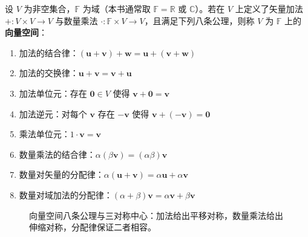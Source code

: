 \begin{definition}[向量空间]\label{def:vector_space}
设 $V$ 为非空集合，$\mathbb{F}$ 为域（本书通常取 $\mathbb{F} = \mathbb{R}$ 或 $\mathbb{C}$）。若在 $V$ 上定义了矢量加法 $+: V \times V \to V$ 与数量乘法 $\cdot: \mathbb{F} \times V \to V$，且满足下列八条公理，则称 $V$ 为 $\mathbb{F}$ 上的\textbf{向量空间}：
\begin{enumerate}[label=(\roman*)]
    \item 加法的结合律：$(\mathbf{u} + \mathbf{v}) + \mathbf{w} = \mathbf{u} + (\mathbf{v} + \mathbf{w})$
    \item 加法的交换律：$\mathbf{u} + \mathbf{v} = \mathbf{v} + \mathbf{u}$
    \item 加法单位元：存在 $\mathbf{0} \in V$ 使得 $\mathbf{v} + \mathbf{0} = \mathbf{v}$
    \item 加法逆元：对每个 $\mathbf{v}$ 存在 $-\mathbf{v}$ 使得 $\mathbf{v} + (-\mathbf{v}) = \mathbf{0}$
    \item 乘法单位元：$1 \cdot \mathbf{v} = \mathbf{v}$
    \item 数量乘法的结合律：$\alpha(\beta\mathbf{v}) = (\alpha\beta)\mathbf{v}$
    \item 数量对矢量的分配律：$\alpha(\mathbf{u} + \mathbf{v}) = \alpha\mathbf{u} + \alpha\mathbf{v}$
    \item 数量对域加法的分配律：$(\alpha + \beta)\mathbf{v} = \alpha\mathbf{v} + \beta\mathbf{v}$
\end{enumerate}
\end{definition}

\begin{figure}[htbp]
\centering
{}
\caption{向量空间八条公理与三对称中心：加法给出平移对称，数量乘法给出伸缩对称，分配律保证二者相容。}
\label{fig:vector_space_axioms}
\end{figure}

